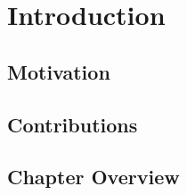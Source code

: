 \chapter{Introduction}
\label{chap:introduction}
\section{Motivation}
\section{Contributions}
\section{Chapter Overview}
